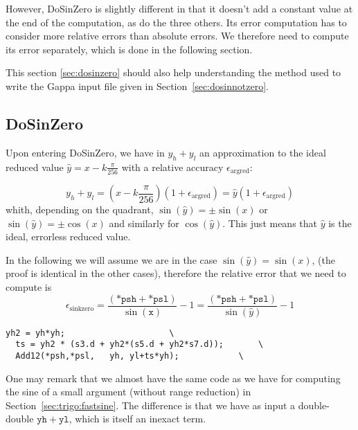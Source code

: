 However, DoSinZero is slightly different in that it doesn't add a
constant value at the end of the computation, as do the three others.
Its error computation has to consider more relative errors than
absolute errors. We therefore need to compute its error separately,
which is done in the following section.

This section \ref{sec:dosinzero} should also help understanding the
method used to write the Gappa input file given in
Section~\ref{sec:dosinnotzero}.



\subsection{DoSinZero \label{sec:dosinzero} }
Upon entering  DoSinZero, we have in
$y_h+y_l$ an approximation to the ideal reduced value
$\hat{y}=x-k\frac{\pi}{256}$ with a relative accuracy $\epsilon_{\mathrm{argred}}$:

\begin{equation}
  y_h+y_l = (x-k\frac{\pi}{256})(1+\epsilon_{\mathrm{argred}}) 
  = \hat{y}(1+\epsilon_{\mathrm{argred}})
  \label{eq:sinargrederror1}
\end{equation}
whith, depending on the quadrant, $\sin(\hat{y}) = \pm\sin(x)$ or
$\sin(\hat{y}) = \pm\cos(x)$ and similarly for $\cos(\hat{y})$. This
just means that $\hat{y}$ is the ideal, errorless reduced value.


In the following we will
assume we are in the case $\sin(\hat{y}) = \sin(x)$, (the proof is
identical in the other cases), therefore the relative error that we need
to compute is
\begin{equation}
  \epsilon_{\mathrm{sinkzero}} = \frac{(\mathtt{*psh} + \mathtt{*psl})}{\sin(\mathtt{x})} -1 = \frac{(\mathtt{*psh} + \mathtt{*psl})}{\sin(\hat{y})} -1
\end{equation}


 \begin{lstlisting}[caption={DoSinZero},firstnumber=1]
  yh2 = yh*yh;					   \
  ts = yh2 * (s3.d + yh2*(s5.d + yh2*s7.d));	   \
  Add12(*psh,*psl,   yh, yl+ts*yh);	           \
\end{lstlisting}

One may remark that we almost have the same code as we have for
computing the sine of a small argument (without range reduction) in
Section~\ref{sec:trigo:fastsine}. The difference is that we have as
input a double-double $\mathtt{yh}+\mathtt{yl}$, which is itself an
inexact term.

